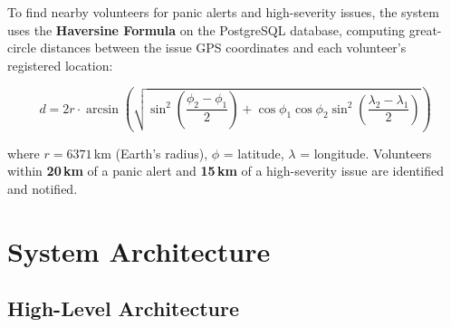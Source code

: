 \documentclass[12pt,a4paper]{article}
\begin{document}
To find nearby volunteers for panic alerts and high-severity issues,
the system uses the \textbf{Haversine Formula} on the PostgreSQL database,
computing great-circle distances between the issue GPS coordinates and
each volunteer's registered location:

\[
d = 2r \cdot \arcsin\!\left(\sqrt{
  \sin^2\!\left(\dfrac{\phi_2 - \phi_1}{2}\right)
  + \cos\phi_1 \cos\phi_2 \sin^2\!\left(\dfrac{\lambda_2 - \lambda_1}{2}\right)
}\right)
\]

where $r = 6371$\,km (Earth's radius), $\phi$ = latitude, $\lambda$ = longitude.
Volunteers within \textbf{20\,km} of a panic alert and \textbf{15\,km}
of a high-severity issue are identified and notified.

\newpage
\section{System Architecture}

\subsection{High-Level Architecture}
\end{document}
